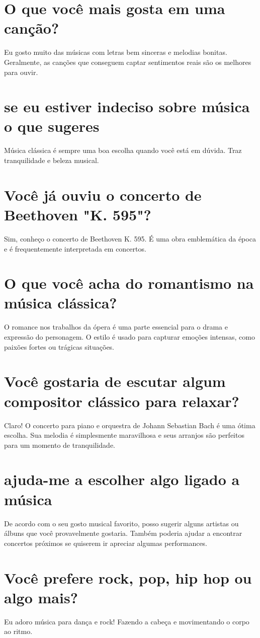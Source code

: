 \documentclass[11pt,a4paper]{article}
\begin{document}
\section{O que você mais gosta em uma canção?}
Eu gosto muito das músicas com letras bem sinceras e melodias bonitas. Geralmente, as canções que conseguem captar sentimentos reais são os melhores para ouvir.

\section{se eu estiver indeciso sobre música o que sugeres}
Música clássica é sempre uma boa escolha quando você está em dúvida. Traz tranquilidade e beleza musical.

\section{Você já ouviu o concerto de Beethoven "K. 595"?}
Sim, conheço o concerto de Beethoven K. 595. É uma obra emblemática da época e é frequentemente interpretada em concertos.

\section{O que você acha do romantismo na música clássica?}
O romance nos trabalhos da ópera é uma parte essencial para o drama e expressão do personagem. O estilo é usado para capturar emoções intensas, como paixões fortes ou trágicas situações.

\section{Você gostaria de escutar algum compositor clássico para relaxar?}
Claro! O concerto para piano e orquestra de Johann Sebastian Bach é uma ótima escolha. Sua melodia é simplesmente maravilhosa e seus arranjos são perfeitos para um momento de tranquilidade.

\section{ajuda-me a escolher algo ligado a música}
De acordo com o seu gosto musical favorito, posso sugerir alguns artistas ou álbuns que você provavelmente gostaria. Também poderia ajudar a encontrar concertos próximos se quiserem ir apreciar algumas performances.

\section{Você prefere rock, pop, hip hop ou algo mais?}
Eu adoro música para dança e rock! Fazendo a cabeça e movimentando o corpo ao ritmo.
\end{document}
